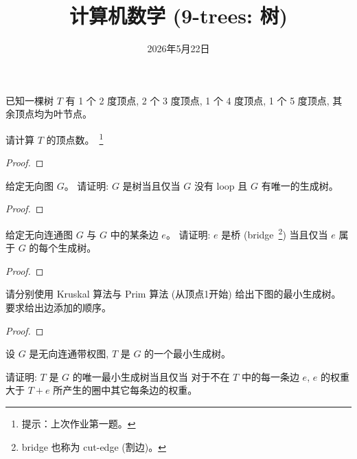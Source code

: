 \documentclass[a4paper, justified]{tufte-handout}
\title{计算机数学 (9-trees: 树)}
\date{2026年5月22日}
\begin{document}
\maketitle
\noplagiarism %
\begin{abstract}
\end{abstract}
\beginrequired

\begin{problem}[树的顶点度数]
  已知一棵树 $T$ 有 1 个 2 度顶点,
  2 个 3 度顶点, 1 个 4 度顶点, 1 个 5 度顶点,
  其余顶点均为叶节点。

  \noindent 请计算 $T$ 的顶点数。~\footnote{
    提示：上次作业第一题。
  }
\end{problem}

\begin{proof}
\end{proof}

\begin{problem}[树的刻画]
  给定无向图 $G$。
  请证明: $G$ 是树当且仅当 $G$ 没有 loop 且 $G$ 有唯一的生成树。
\end{problem}

\begin{proof}
\end{proof}

\begin{problem}[生成树与桥]
  给定无向连通图 $G$ 与 $G$ 中的某条边 $e$。
  请证明: $e$ 是桥 (bridge~\footnote{bridge 也称为 cut-edge (割边)。})
    当且仅当 $e$ 属于 $G$ 的每个生成树。
\end{problem}

\begin{proof}
\end{proof}

\begin{problem}[最小生成树算法]
  请分别使用 Kruskal 算法与 Prim 算法 (从顶点1开始)
  给出下图的最小生成树。
  要求给出边添加的顺序。

\end{problem}

\begin{proof}
\end{proof}

\begin{problem}[唯一最小生成树]
  设 $G$ 是无向连通带权图, $T$ 是 $G$ 的一个最小生成树。

  \noindent 请证明: $T$ 是 $G$ 的唯一最小生成树当且仅当
  对于不在 $T$ 中的每一条边 $e$,
  $e$ 的权重大于 $T + e$ 所产生的圈中其它每条边的权重。
\end{problem}
\end{document}
